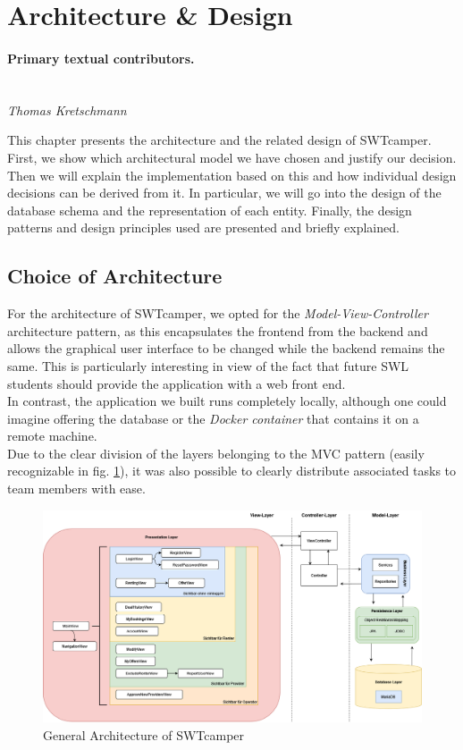 \section{Architecture \& Design}
\label{sec:architecture_design}

\paragraph{Primary textual contributors.}
\mbox{}\\\emph{Thomas Kretschmann}

This chapter presents the architecture and the related design of SWTcamper. First, we show which architectural model we have chosen and justify our decision. Then we will explain the implementation based on this and how individual design decisions can be derived from it. In particular, we will go into the design of the database schema and the representation of each entity. Finally, the design patterns and design principles used are presented and briefly explained.

\subsection{Choice of Architecture}
For the architecture of SWTcamper, we opted for the \textit{Model-View-Controller} architecture pattern, as this encapsulates the frontend from the backend and allows the graphical user interface to be changed while the backend remains the same. This is particularly interesting in view of the fact that future SWL students should provide the application with a web front end. \\
In contrast, the application we built runs completely locally, although one could imagine offering the database or the \textit{Docker container} that contains it on a remote machine. \\
Due to the clear division of the layers belonging to the MVC pattern (easily recognizable in fig. \ref{fig:architecture}), it was also possible to clearly distribute associated tasks to team members with ease.

\begin{figure}[h]
	\centering
	\includegraphics[width=15cm]{resources/images/architecture.drawio.png}
	\caption{General Architecture of SWTcamper}
	\label{fig:architecture}
\end{figure}

